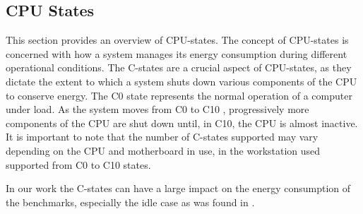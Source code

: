 \subsection{CPU States}\label{subsec:cpustates}

This section provides an overview of CPU-states. The concept of CPU-states is concerned with how a system manages its energy consumption during different operational conditions. The C-states are a crucial aspect of CPU-states, as they dictate the extent to which a system shuts down various components of the CPU to conserve energy. The C0 state represents the normal operation of a computer under load.\cite{CIntel,CHard} As the system moves from C0 to C10 \cite{biksbois}, progressively more components of the CPU are shut down until, in C10, the CPU is almost inactive. It is important to note that the number of C-states supported may vary depending on the CPU and motherboard in use, in \cite{biksbois} the workstation used supported from C0 to C10 states.


In our work the C-states can have a large impact on the energy consumption of the benchmarks, especially the idle case as was found in \cite{biksbois}.
